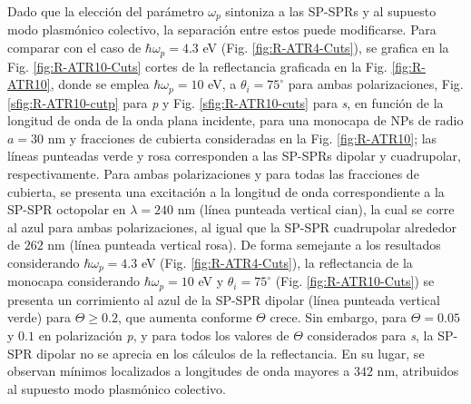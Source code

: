 Dado que la elección del parámetro $\omega_p$ sintoniza a las SP-SPRs y al supuesto modo plasmónico colectivo, la separación entre estos puede modificarse. Para comparar con el caso de $\hbar\omega_p=4.3$ eV (Fig. \ref{fig:R-ATR4-Cuts}), se grafica en la Fig. \ref{fig:R-ATR10-Cuts} cortes de la reflectancia graficada en la Fig. \ref{fig:R-ATR10}, donde se emplea $\hbar\omega_p = 10$ eV, a $\theta_i = 75^\circ$ para ambas polarizaciones,  Fig. \ref{sfig:R-ATR10-cutp} para \emph{p} y Fig. \ref{sfig:R-ATR10-cuts} para \emph{s}, en  función de la longitud de onda de la onda plana incidente, para una monocapa de NPs de radio $a= 30$ nm  y fracciones de cubierta consideradas en la Fig. \ref{fig:R-ATR10}; las líneas punteadas verde y rosa  corresponden a las SP-SPRs dipolar y cuadrupolar, respectivamente. Para ambas polarizaciones y para todas las fracciones de cubierta, se presenta una excitación a la longitud de onda correspondiente a la SP-SPR octopolar en $\lambda=240$ nm (línea punteada vertical cian), la cual se corre al azul para ambas polarizaciones, al igual que  la SP-SPR cuadrupolar alrededor de $262$ nm (línea punteada vertical rosa). De forma semejante a los resultados considerando $\hbar\omega_p = 4.3$ eV (Fig. \ref{fig:R-ATR4-Cuts}), la reflectancia de la monocapa considerando $\hbar\omega_p=10$ eV y $\theta_i=75^\circ$ (Fig. \ref{fig:R-ATR10-Cuts}) se presenta un corrimiento al azul de la SP-SPR dipolar (línea punteada vertical verde) para $\Theta\geq 0.2$, que aumenta conforme $\Theta$ crece. Sin embargo, para $\Theta=0.05$ y $0.1$ en polarización \emph{p}, y para todos los valores de $\Theta$ considerados para \emph{s}, la SP-SPR dipolar no se aprecia en los cálculos de la reflectancia. En su lugar, se observan mínimos  localizados a longitudes de onda mayores a $342$ nm, atribuidos al supuesto modo plasmónico colectivo.

